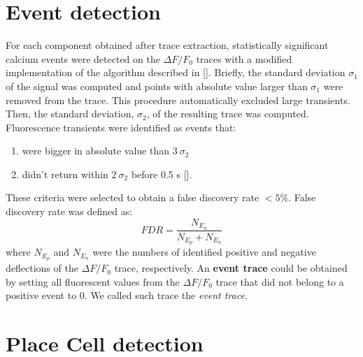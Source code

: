 \section{Event detection}
\label{chap3:sec:6:event_det}
For each component obtained after trace extraction, statistically significant calcium events were detected on the $\Delta F/F_0$ traces with a modified implementation of the algorithm described in [\cite{dombeck2007}]. 
Briefly, the standard deviation $\sigma_1$ of the signal was computed and points with absolute value larger than $\sigma_1$ were removed from the trace. 
This procedure automatically excluded large transients.
Then, the standard deviation, $\sigma_2$, of the resulting trace was computed. 
Fluorescence transients were identified as events that:
\begin{enumerate}[label=\roman*)]
    \item were bigger in absolute value than $3\ \sigma_2$ 
    \item didn't return within $2\ \sigma_2$ before 0.5 s [\cite{dombeck2007}].
\end{enumerate}
These criteria were selected to obtain a false discovery rate $< 5\%$.
False discovery rate was defined as: 
\begin{equation}
    FDR = \frac{N_{E_n}}{N_{E_p}+N_{E_n}}
\end{equation}
where $N_{E_p}$ and $N_{E_n}$ were the numbers of identified positive and negative deflections of the $\Delta F/F_0$ trace, respectively. 
An \textbf{event trace} could be obtained by setting all fluorescent values from the $\Delta F/F_0$ trace that did not belong to a positive event to 0. 
We called such trace the \textit{event trace}.

\section{Place Cell detection}
\label{chap3:sec:7:pc_det}
